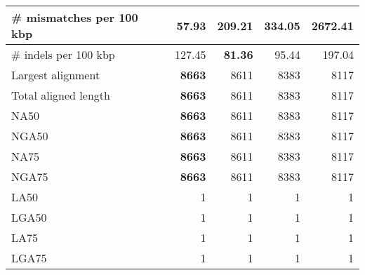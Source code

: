 \documentclass[12pt,a4paper]{article}
\begin{document}
\begin{table}[ht]
\begin{center}
\begin{tabular}{|l*{4}{|r}|}
\# mismatches per 100 kbp & {\bf 57.93} & 209.21 & 334.05 & 2672.41 \\ \hline
\# indels per 100 kbp & 127.45 & {\bf 81.36} & 95.44 & 197.04 \\ \hline
Largest alignment & {\bf 8663} & 8611 & 8383 & 8117 \\ \hline
Total aligned length & {\bf 8663} & 8611 & 8383 & 8117 \\ \hline
NA50 & {\bf 8663} & 8611 & 8383 & 8117 \\ \hline
NGA50 & {\bf 8663} & 8611 & 8383 & 8117 \\ \hline
NA75 & {\bf 8663} & 8611 & 8383 & 8117 \\ \hline
NGA75 & {\bf 8663} & 8611 & 8383 & 8117 \\ \hline
LA50 & 1 & 1 & 1 & 1 \\ \hline
LGA50 & 1 & 1 & 1 & 1 \\ \hline
LA75 & 1 & 1 & 1 & 1 \\ \hline
LGA75 & 1 & 1 & 1 & 1 \\ \hline
\end{tabular}
\end{center}
\end{table}
\end{document}
